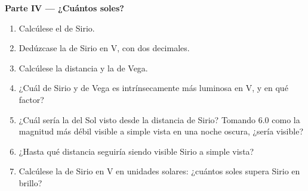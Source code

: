 \begin{problem}
\medskip
\noindent\textbf{Parte IV --- ¿Cuántos soles?}
\begin{enumerate}[resume]
  \item Calcúlese el  de Sirio.
  \item Dedúzcase la  de Sirio en V, con dos decimales.
  \item Calcúlese la distancia y la  de Vega.
  \item ¿Cuál de Sirio y de Vega es intrínsecamente más luminosa en V, y en qué factor?
  \item ¿Cuál sería la  del Sol visto desde la distancia de Sirio? Tomando
        6.0 como la magnitud más débil visible a simple vista en una noche oscura, ¿sería
        visible?
  \item ¿Hasta qué distancia seguiría siendo visible Sirio a simple vista?
  \item Calcúlese la  de Sirio en V en unidades solares: ¿cuántos soles supera
        Sirio en brillo?
\end{enumerate}
\end{problem}
